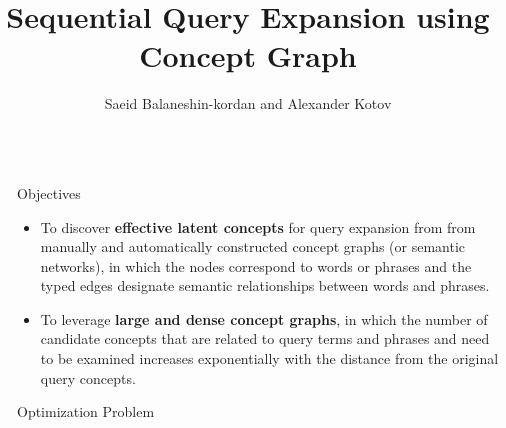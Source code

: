 \documentclass[final]{beamer}
\title{Sequential Query Expansion using Concept Graph} %
\author{  Saeid Balaneshin-kordan and
 Alexander Kotov} %
\institute{Computer Science Department, Wayne State University} %
\newlength{\sepwid}
\newlength{\onecolwid}
\begin{document}

\setlength{\belowcaptionskip}{2ex} %
\setlength\belowdisplayshortskip{2ex} %

\begin{frame}[t] %

\begin{columns}[t] %

\begin{column}{\sepwid}\end{column} %

\begin{column}{\onecolwid} %


\begin{alertblock}{Objectives}
\begin{itemize}
\item To discover \textbf{effective latent concepts} for query
expansion from from manually and automatically constructed concept graphs (or semantic networks), in which the nodes correspond to words
or phrases and the typed edges designate semantic relationships between words and phrases. 
\item To leverage \textbf{large and dense concept graphs}, in which the number of candidate concepts that
are related to query terms and phrases and need to be examined increases exponentially with the distance from the
original query concepts.
\end{itemize} 
\end{alertblock}


\begin{block}{Optimization Problem}


\end{block}
\end{column}
\end{columns}
\end{frame}
\end{document}
